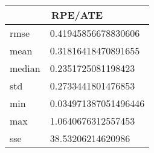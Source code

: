 \begin{table}[!ht] 
 \centering 
 \begin{tabular}{|l|l|} \hline 
 \multicolumn{2}{|c|}{RPE/ATE} \\ \hline 
 rmse & 0.41945856678830606 \\ \hline 
mean & 0.31816418470891655 \\ \hline 
median & 0.2351725081198423 \\ \hline 
std & 0.2733441801476853 \\ \hline 
min & 0.034971387051496446 \\ \hline 
max & 1.0640676312557453 \\ \hline 
sse & 38.53206214620986 \\ \hline 
\end{tabular} 
 \end{table}